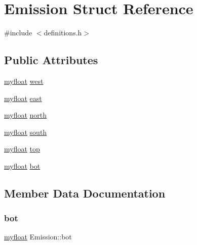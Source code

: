 \hypertarget{structEmission}{}\section{Emission Struct Reference}
\label{structEmission}


{\ttfamily \#include $<$definitions.\+h$>$}

\subsection*{Public Attributes}
\begin{DoxyCompactItemize}
\item 
\hyperlink{param_8h_a5f097c9f3873af7be7fc156e6a06ca5e}{myfloat} \hyperlink{structEmission_a900bfa3e3e13b3a85d3fbe1c3c2e8263}{west}
\item 
\hyperlink{param_8h_a5f097c9f3873af7be7fc156e6a06ca5e}{myfloat} \hyperlink{structEmission_a8de6316f9ca0a64a8cdf28722fdb2dbc}{east}
\item 
\hyperlink{param_8h_a5f097c9f3873af7be7fc156e6a06ca5e}{myfloat} \hyperlink{structEmission_ab9db4a509a3f5d30caa56623f42397c4}{north}
\item 
\hyperlink{param_8h_a5f097c9f3873af7be7fc156e6a06ca5e}{myfloat} \hyperlink{structEmission_a8bc796f7f0d26bc1ad7342c9cf46b7ae}{south}
\item 
\hyperlink{param_8h_a5f097c9f3873af7be7fc156e6a06ca5e}{myfloat} \hyperlink{structEmission_a6efd76af6756040d8e12b003598356df}{top}
\item 
\hyperlink{param_8h_a5f097c9f3873af7be7fc156e6a06ca5e}{myfloat} \hyperlink{structEmission_a2e05058b18ab1a010528192792f93b04}{bot}
\end{DoxyCompactItemize}


\subsection{Member Data Documentation}
\mbox{\label{structEmission_a2e05058b18ab1a010528192792f93b04}} 
\subsubsection{\texorpdfstring{bot}{bot}}
{\footnotesize\ttfamily \hyperlink{param_8h_a5f097c9f3873af7be7fc156e6a06ca5e}{myfloat} Emission\+::bot}

\mbox{\label{structEmission_a8de6316f9ca0a64a8cdf28722fdb2dbc}} 
